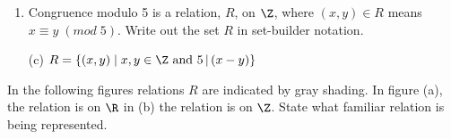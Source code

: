 \begin{questions}
\begin{enumerate}[label=(\alph*),itemsep=1pt,parsep=0pt,
        topsep=0pt,partopsep=0pt]
    \item Congruence modulo 5 is a relation, $R$, on $\Z$, where $(x,y) \in R$ means $x \equiv y \;(mod\; 5)$.  Write out the set $R$ in set-builder notation.
    \begin{solution}
    	(c)  $ R = \{ (x,y) \;|\;  x, y\in \Z \text{ and } 5 \,|\, (x-y) \}$
    \end{solution}
\end{enumerate}

% 	 






 In the following figures relations $R$ are indicated by gray shading.  In figure (a), the relation is on $\R$ in (b) the relation is on $\Z$.  State what familiar relation is being represented. 


\end{questions}

